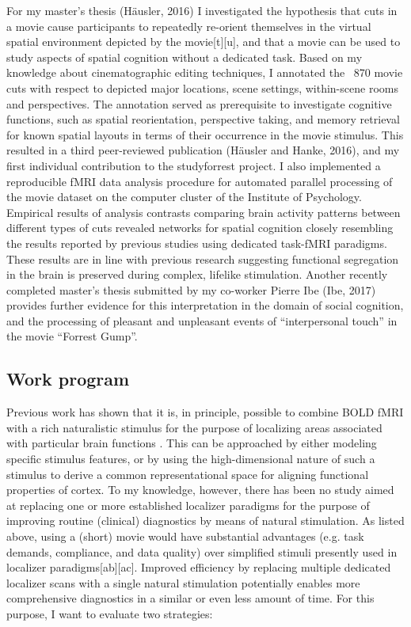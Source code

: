For my master's thesis (Häusler, 2016) I investigated the hypothesis that cuts
in a movie cause participants to repeatedly re-orient themselves in the virtual
spatial environment depicted by the movie[t][u], and that a movie can be used to
study aspects of spatial cognition without a dedicated task.
%
Based on my knowledge about cinematographic editing techniques, I annotated the
~870 movie cuts with respect to depicted major locations, scene settings,
within-scene rooms and perspectives.
%
The annotation served as prerequisite to investigate cognitive functions, such
as spatial reorientation, perspective taking, and memory retrieval for known
spatial layouts in terms of their occurrence in the movie stimulus.
%
This resulted in a third peer-reviewed publication (Häusler and Hanke, 2016),
and my first individual contribution to the studyforrest project.
%
I also implemented a reproducible fMRI data analysis procedure for automated
parallel processing of the movie dataset on the computer cluster of the
Institute of Psychology.
%
Empirical results of analysis contrasts comparing brain activity patterns
between different types of cuts revealed networks for spatial cognition closely
resembling the results reported by previous studies \citep{epstein1998ppa,
vanassche2016functional} using dedicated task-fMRI paradigms.
%
These results are in line with previous research \citep{bartels2004mapping}
suggesting functional segregation in the brain is preserved during complex,
lifelike stimulation.
%
Another recently completed master's thesis submitted by my co-worker Pierre Ibe
(Ibe, 2017) provides further evidence for this interpretation in the domain of
social cognition, and the processing of pleasant and unpleasant events of
``interpersonal touch'' in the movie ``Forrest Gump''.


\subsection{Work program}
%
Previous work has shown that it is, in principle, possible to combine BOLD fMRI
with a rich naturalistic stimulus for the purpose of localizing areas associated
with particular brain functions \citep{bartels2004mapping}.
%
This can be approached by either modeling specific stimulus features, or by
using the high-dimensional nature of such a stimulus to derive a common
representational space for aligning functional properties of cortex.
%
To my knowledge, however, there has been no study aimed at replacing one or more
established localizer paradigms for the purpose of improving routine (clinical)
diagnostics by means of natural stimulation.
%
As listed above, using a (short) movie would have substantial advantages (e.g.
task demands, compliance, and data quality) over simplified stimuli presently
used in localizer paradigms[ab][ac].
%
Improved efficiency by replacing multiple dedicated localizer scans with a
single natural stimulation potentially enables more comprehensive diagnostics in
a similar or even less amount of time.
%
For this purpose, I want to evaluate two strategies:


